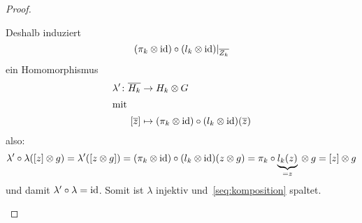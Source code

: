 \begin{proof}
\begin{enumerate}
\begin{equation*}
      \end{equation*}
      Deshalb induziert
      \begin{equation*}
        (\pi_k \otimes \operatorname{id}) \circ (l_k \otimes \operatorname{id}) |_{\overline{Z_k}}
      \end{equation*}
      ein Homomorphismus
      \begin{align*}
        \lambda' \colon \overline{H_k} & \to H_k \otimes G \\
        \intertext{mit}
        [\overline z] & \mapsto (\pi_k \otimes \operatorname{id}) \circ (l_k \otimes \operatorname{id}) (\overline z)
      \end{align*}
      also:
      \begin{equation*}
        \lambda' \circ \lambda ([z] \otimes g) = \lambda' ([z \otimes g]) = (\pi_k \otimes \operatorname{id}) \circ (l_k \otimes \operatorname{id}) (z \otimes g) = \pi_k \circ \underbrace{l_k (z)}_{= z} {} \otimes g = [z] \otimes g
      \end{equation*}
      und damit $\lambda' \circ \lambda = \operatorname{id}$.
      Somit ist $\lambda$ injektiv und~\eqref{seq:komposition} spaltet.
  \end{enumerate}
\end{proof}
